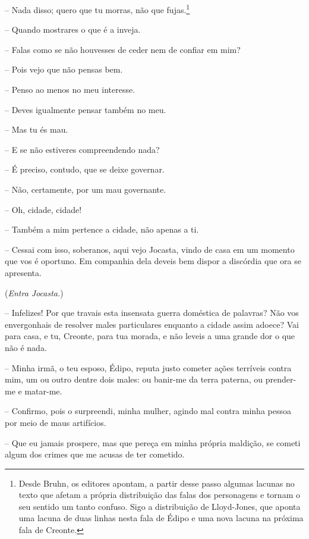  --   Nada disso; quero que tu morras, não que fujas.\footnote{Desde Bruhn, os editores apontam, a partir desse
  passo algumas lacunas no texto que afetam a própria distribuição das
  falas dos personagens e tornam o seu sentido um tanto confuso. Sigo a
  distribuição de Lloyd-Jones, que aponta uma lacuna de duas linhas
  nesta fala de Édipo e uma nova lacuna na próxima fala de Creonte.}

 --   Quando mostrares o que é a inveja.

 --   Falas como se não houvesses de ceder nem de confiar em mim?

 --   Pois vejo que não pensas bem.

 --   Penso ao menos no meu interesse.

 --   Deves igualmente pensar também no meu.

 --   Mas tu és mau.

 --   E se não estiveres compreendendo nada?

 --   É preciso, contudo, que se deixe governar.

 --   Não, certamente, por um mau governante.

 --   Oh, cidade, cidade!

 --    Também a mim pertence a cidade, não apenas a ti.

 --   Cessai com isso, soberanos, aqui vejo Jocasta, vindo de casa em um
momento que vos é oportuno. Em companhia dela deveis bem dispor a
discórdia que ora se apresenta.

(\emph{Entra Jocasta.})

 --   Infelizes! Por que travais esta insensata guerra doméstica de palavras?
Não vos envergonhais de resolver males particulares enquanto a cidade
assim adoece? Vai para casa, e tu, Creonte, para tua morada, e não
leveis a uma grande dor o que não é nada.

 --    Minha irmã, o teu esposo, Édipo, reputa justo cometer ações
terríveis contra mim, um ou outro dentre dois males: ou banir-me da
terra paterna, ou prender-me e matar-me.

 --   Confirmo, pois o surpreendi, minha mulher, agindo mal contra minha
pessoa por meio de maus artifícios.

 --   Que eu jamais prospere, mas que pereça em minha própria maldição, se
cometi algum dos crimes que me acusas de ter cometido.


